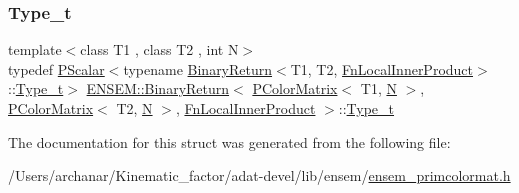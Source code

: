 \subsubsection{\texorpdfstring{Type\_t}{Type\_t}\hspace{0.1cm}{\footnotesize\ttfamily [3/3]}}
{\footnotesize\ttfamily template$<$class T1 , class T2 , int N$>$ \\
typedef \mbox{\hyperlink{classENSEM_1_1PScalar}{P\+Scalar}}$<$typename \mbox{\hyperlink{structENSEM_1_1BinaryReturn}{Binary\+Return}}$<$T1, T2, \mbox{\hyperlink{structENSEM_1_1FnLocalInnerProduct}{Fn\+Local\+Inner\+Product}}$>$\+::\mbox{\hyperlink{structENSEM_1_1BinaryReturn_3_01PColorMatrix_3_01T1_00_01N_01_4_00_01PColorMatrix_3_01T2_00_01N_8f6cd73d0788242d6be21a14b362f366_a94506a87a1a1b8e9ecfc9d665acaa10b}{Type\+\_\+t}}$>$ \mbox{\hyperlink{structENSEM_1_1BinaryReturn}{E\+N\+S\+E\+M\+::\+Binary\+Return}}$<$ \mbox{\hyperlink{classENSEM_1_1PColorMatrix}{P\+Color\+Matrix}}$<$ T1, \mbox{\hyperlink{adat__devel_2lib_2hadron_2operator__name__util_8cc_a7722c8ecbb62d99aee7ce68b1752f337}{N}} $>$, \mbox{\hyperlink{classENSEM_1_1PColorMatrix}{P\+Color\+Matrix}}$<$ T2, \mbox{\hyperlink{adat__devel_2lib_2hadron_2operator__name__util_8cc_a7722c8ecbb62d99aee7ce68b1752f337}{N}} $>$, \mbox{\hyperlink{structENSEM_1_1FnLocalInnerProduct}{Fn\+Local\+Inner\+Product}} $>$\+::\mbox{\hyperlink{structENSEM_1_1BinaryReturn_3_01PColorMatrix_3_01T1_00_01N_01_4_00_01PColorMatrix_3_01T2_00_01N_8f6cd73d0788242d6be21a14b362f366_a94506a87a1a1b8e9ecfc9d665acaa10b}{Type\+\_\+t}}}



The documentation for this struct was generated from the following file\+:\begin{DoxyCompactItemize}
\item 
/\+Users/archanar/\+Kinematic\+\_\+factor/adat-\/devel/lib/ensem/\mbox{\hyperlink{adat-devel_2lib_2ensem_2ensem__primcolormat_8h}{ensem\+\_\+primcolormat.\+h}}\end{DoxyCompactItemize}
